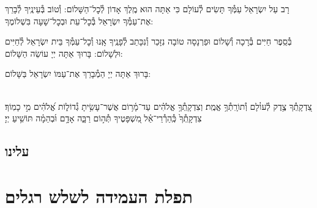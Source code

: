 \documentclass[twoside, openany, parskip=half, 11pt]{book}
\begin{document}
 

\sepline

\label{ytmincha}
\ytkiddushhayom

\sepline

\retzeh

\yaalehveyavo

\zion

\modim

\shabboschanukah

\shabboshodos

רָב עַל יִשְׂרָאֵל עַמְּ֯ךָ תָּשִׂים לְ֯עוֹלָם כִּי אַתָּה הוּא מֶֽלֶךְ אָדוֹן לְ֯כׇל־הַשָּׁלוֹם: וְ֯טוֹב בְּ֯עֵינֶֽיךָ לְ֯בָרֵךְ אֶת־עַמְּ֯ךָ יִשְׂרָאֵל בְּ֯כׇל־עֵת וּבְכׇל־שָׁעָה בִּשְׁלוֹמֶךָ:
\vspace{-0.4\baselineskip}
\begin{paracol}{2}

\begin{small}
בְּ֯סֵֽפֶר חַיִּים בְּ֯רָכָה וְ֯שָׁלוֹם וּפַרְנָסָה טוֹבָה נִזָּכֵר וְ֯נִכָּתֵב לְ֯פָנֶֽיךָ אָֽנוּ וְ֯כׇל־עַמְּ֯ךָ בֵּית יִשְׂרָאֵל לְ֯חַיִּים וּלְשָׁלוֹם: בָּרוּךְ אַתָּה יְיָ עוֹשֵׂה הַשָּׁלוֹם:

\end{small}
\switchcolumn
בָּרוּךְ אַתָּה יְיָ הַמְ֯בָרֵךְ אֶת־עַמּוֹ יִשְׂרָאֵל בַּשָּׁלוֹם:

\end{paracol}

\tachanunim

\\
צִ֭דְקָֽתְ֯ךָ צֶ֥דֶק לְ֯עוֹ֗לָם וְ֯תוֹרָֽתְ֯ךָ֥ אֱמֶֽת׃ וְצִדְקָֽתְ֯ךָ֥ אֱלֹהִ֗ים עַד־מָ֫ר֥וֹם אֲשֶׁר־עָשִׂ֥יתָ גְ֯דוֹל֑וֹת אֱ֝לֹהִ֗ים מִ֣י כָמֽוֹךָ׃ צִדְקָֽתְ֯ךָ֙ כְּֽ֯הַרְ֯רֵי־אֵ֗ל מִ֭שְׁפָּטֶיךָ תְּ֯ה֣וֹם רַבָּ֑ה אָדָ֥ם וּ֜בְהֵמָ֗ה תּוֹשִׁ֥יעַ יְיָ׃

\fullkaddish

\section*{ עלינו }

\aleinu


\chapter[תפלת העמידה לשלש רגלים]{ תפלת העמידה לשלש רגלים }
\label{tefilasregel}
\end{document}
